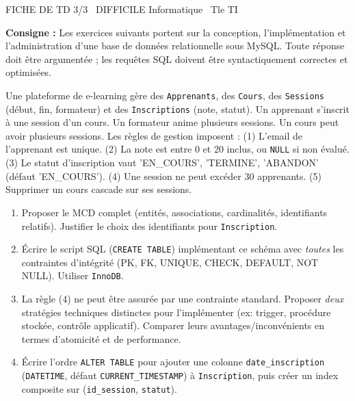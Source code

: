 \documentclass[11pt]{article}
\begin{document}
\begin{tcolorbox}[enhanced,colback=popink,colframe=popink,arc=10pt,boxrule=0pt,left=12pt,right=12pt,top=9pt,bottom=9pt]
{\color{white}\popxbold\small FICHE DE TD 3/3 \textbullet\ DIFFICILE \hfill Informatique \textbullet\ Tle TI\par}
\end{tcolorbox}
\vspace{4pt}
\noindent\textbf{Consigne :} Les exercices suivants portent sur la conception, l'implémentation et l'administration d'une base de données relationnelle sous MySQL. Toute réponse doit être argumentée ; les requêtes SQL doivent être syntactiquement correctes et optimisées.

\begin{exercice}
Une plateforme de e-learning gère des \texttt{Apprenants}, des \texttt{Cours}, des \texttt{Sessions} (début, fin, formateur) et des \texttt{Inscriptions} (note, statut). Un apprenant s'inscrit à une session d'un cours. Un formateur anime plusieurs sessions. Un cours peut avoir plusieurs sessions. Les règles de gestion imposent : (1) L'email de l'apprenant est unique. (2) La note est entre 0 et 20 inclus, ou \texttt{NULL} si non évalué. (3) Le statut d'inscription vaut 'EN\_COURS', 'TERMINE', 'ABANDON' (défaut 'EN\_COURS'). (4) Une session ne peut excéder 30 apprenants. (5) Supprimer un cours cascade sur ses sessions.
\begin{enumerate}
    \item Proposer le MCD complet (entités, associations, cardinalités, identifiants relatifs). Justifier le choix des identifiants pour \texttt{Inscription}.
    \item Écrire le script SQL (\texttt{CREATE TABLE}) implémentant ce schéma avec \emph{toutes} les contraintes d'intégrité (PK, FK, UNIQUE, CHECK, DEFAULT, NOT NULL). Utiliser \texttt{InnoDB}.
    \item La règle (4) ne peut être assurée par une contrainte standard. Proposer \emph{deux} stratégies techniques distinctes pour l'implémenter (ex: trigger, procédure stockée, contrôle applicatif). Comparer leurs avantages/inconvénients en termes d'atomicité et de performance.
    \item Écrire l'ordre \texttt{ALTER TABLE} pour ajouter une colonne \texttt{date\_inscription} (\texttt{DATETIME}, défaut \texttt{CURRENT\_TIMESTAMP}) à \texttt{Inscription}, puis créer un index composite sur (\texttt{id\_session}, \texttt{statut}).
\end{enumerate}
\end{exercice}
\end{document}
